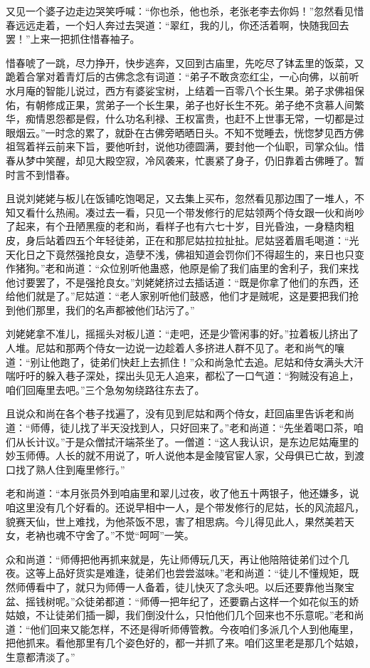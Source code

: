 \documentclass[12pt,oneside]{book}
\begin{document}
又见一个婆子边走边哭笑呼喊：“你也杀，他也杀，老张老李去你妈！”忽然看见惜春远远走着，一个妇人奔过去哭道：“翠红，我的儿，你还活着啊，快随我回去罢！”上来一把抓住惜春袖子。

惜春唬了一跳，尽力挣开，快步逃奔，又回到古庙里，先吃尽了钵盂里的饭菜，又跪着合掌对着青灯后的古佛念念有词道：“弟子不敢贪恋红尘，一心向佛，以前听水月庵的智能儿说过，西方有婆娑宝树，上结着一百零八个长生果。弟子求佛祖保佑，有朝修成正果，赏弟子一个长生果，弟子也好长生不死。弟子绝不贪慕人间繁华，痴情恩怨都是假，什么功名利禄、王权富贵，也赶不上世事无常，一切都是过眼烟云。”一时念的累了，就卧在古佛旁晒晒日头。不知不觉睡去，恍惚梦见西方佛祖驾着祥云前来下旨，要他听封，说他功德圆满，要封他一个仙职，司掌众仙。惜春从梦中笑醒，却见大殿空寂，冷风袭来，忙裹紧了身子，仍旧靠着古佛睡了。暂时言不到惜春。

且说刘姥姥与板儿在饭铺吃饱喝足，又去集上买布，忽然看见那边围了一堆人，不知又看什么热闹。凑过去一看，只见一个带发修行的尼姑领两个侍女跟一伙和尚吵了起来，有个丑陋黑瘦的老和尚，看样子也有六七十岁，目光昏浊，一身糙肉粗皮，身后站着四五个年轻徒弟，正在和那尼姑拉拉扯扯。尼姑竖着眉毛喝道：“光天化日之下竟然强抢良女，造孽不浅，佛祖知道会罚你们不得超生的，来日也只变作猪狗。”老和尚道：“众位别听他蛊惑，他原是偷了我们庙里的舍利子，我们来找他讨要罢了，不是强抢良女。”刘姥姥挤过去插话道：“既是你拿了他们的东西，还给他们就是了。”尼姑道：“老人家别听他们鼓惑，他们才是贼呢，这是要把我们抢到他们那里，我们的名声都被他们玷污了。”

刘姥姥拿不准儿，摇摇头对板儿道：“走吧，还是少管闲事的好。”拉着板儿挤出了人堆。尼姑和那两个侍女一边说一边趁着人多挤进人群不见了。老和尚气的嚷道：“别让他跑了，徒弟们快赶上去抓住！”众和尚急忙去追。尼姑和侍女满头大汗喘吁吁的躲入巷子深处，探出头见无人追来，都松了一口气道：“狗贼没有追上，咱们回庵里去吧。”三个急匆匆绕路往东去了。

且说众和尚在各个巷子找遍了，没有见到尼姑和两个侍女，赶回庙里告诉老和尚道：“师傅，徒儿找了半天没找到人，只好回来了。”老和尚道：“先坐着喝口茶，咱们从长计议。”于是众僧拭汗端茶坐了。一僧道：“这人我认识，是东边尼姑庵里的妙玉师傅。人长的就不用说了，听人说他本是金陵官宦人家，父母俱已亡故，到渡口找了熟人住到庵里修行。”

老和尚道：“本月张员外到咱庙里和翠儿过夜，收了他五十两银子，他还嫌多，说咱这里没有几个好看的。还说早相中一人，是个带发修行的尼姑，长的风流超凡，貌赛天仙，世上难找，为他茶饭不思，害了相思病。今儿得见此人，果然美若天女，老衲也魂不守舍了。”不觉“呵呵”一笑。

众和尚道：“师傅把他再抓来就是，先让师傅玩几天，再让他陪陪徒弟们过个几夜。这等上品好货实是难逢，徒弟们也尝尝滋味。”老和尚道：“徒儿不懂规矩，既然师傅看中了，就只为师傅一人备着，徒儿快灭了念头吧。以后还要靠他当聚宝盆、摇钱树呢。”众徒弟都道：“师傅一把年纪了，还要霸占这样一个如花似玉的娇姑娘，不让徒弟们插一脚，我们倒没什么，只怕他们几个回来也不乐意呢。”老和尚道：“他们回来又能怎样，不还是得听师傅管教。今夜咱们多派几个人到他庵里，把他抓来。看他那里有几个姿色好的，都一并抓了来。咱们这里老是那几个姑娘，生意都清淡了。”
\end{document}

